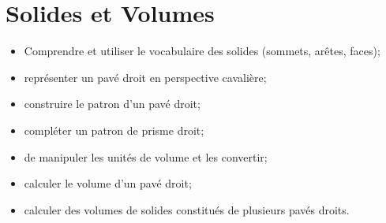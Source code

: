 \chapter{Solides et Volumes}\label{ChSolidesVolumes}


\vspace{5cm}
\begin{acquis}
\begin{itemize}
\item Comprendre et utiliser le vocabulaire des solides (sommets, arêtes, faces);
\item représenter un pavé droit en perspective cavalière;
\item construire le patron d’un pavé droit;
\item compléter un patron de prisme droit;
\item de manipuler les unités de volume et les convertir;
\item calculer le volume d’un pavé droit;
\item calculer des volumes de solides constitués de plusieurs pavés droits.
\end{itemize}
\end{acquis}

\activites




\exercicesbase
\begin{colonne*exercice}

\end{colonne*exercice}


\exercicesappr
\begin{colonne*exercice}

\end{colonne*exercice}

\connaissances


\TravauxPratiques %


\pagebreak

\recreation



